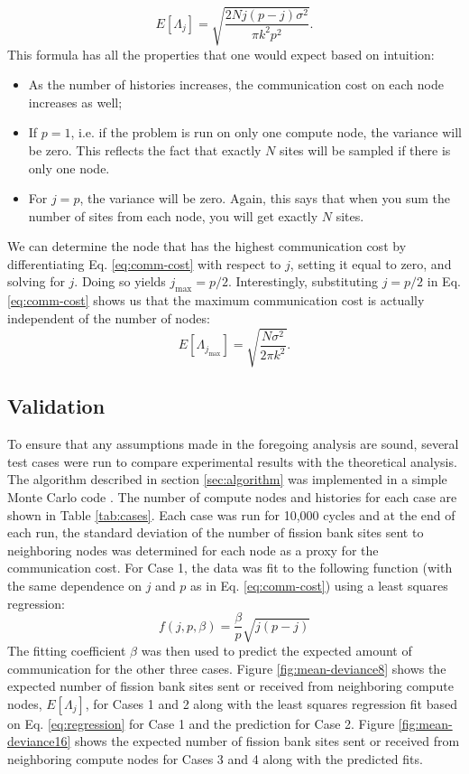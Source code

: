 \documentclass[11pt]{article}
\begin{document}
\begin{equation}\label{eq:comm-cost}
  E \left [ \Lambda_j \right ] = \sqrt{\frac{2Nj(p-j)\sigma^2}{\pi
      k^2p^2}}.
\end{equation}
This formula has all the properties that one would expect based on
intuition:
\begin{itemize}
\item As the number of histories increases, the communication cost on
  each node increases as well;
\item If $p=1$, i.e. if the problem is run on only one compute node,
  the variance will be zero. This reflects the fact that exactly $N$
  sites will be sampled if there is only one node.
\item For $j=p$, the variance will be zero. Again, this says that when
  you sum the number of sites from each node, you will get exactly $N$
  sites.
\end{itemize}
We can determine the node that has the highest communication cost by
differentiating Eq. \ref{eq:comm-cost} with respect to $j$, setting it
equal to zero, and solving for $j$. Doing so yields $j_{\text{max}} =
p/2$. Interestingly, substituting $j = p/2$ in Eq. \ref{eq:comm-cost}
shows us that the maximum communication cost is actually independent
of the number of nodes:
\begin{equation}
  E \left [ \Lambda_{j_{\text{max}}} \right ] = \sqrt{
    \frac{N\sigma^2}{2\pi k^2}}.
\end{equation}

\subsection{Validation}

To ensure that any assumptions made in the foregoing analysis are
sound, several test cases were run to compare experimental results
with the theoretical analysis. The algorithm described in section
\ref{sec:algorithm} was implemented in a simple Monte Carlo code
\cite{romano-LANL}. The number of compute nodes and histories for each
case are shown in Table \ref{tab:cases}.  Each case was run for 10,000
cycles and at the end of each run, the standard deviation of the
number of fission bank sites sent to neighboring nodes was determined
for each node as a proxy for the communication cost. For Case 1, the
data was fit to the following function (with the same dependence on
$j$ and $p$ as in Eq. \ref{eq:comm-cost}) using a least squares
regression:
\begin{equation}\label{eq:regression}
  f(j,p,\beta) = \frac{\beta}{p} \sqrt{j(p-j)}
\end{equation}
The fitting coefficient $\beta$ was then used to predict the expected
amount of communication for the other three cases. Figure
\ref{fig:mean-deviance8} shows the expected number of fission bank
sites sent or received from neighboring compute nodes, $E \left [
  \Lambda_j \right ]$, for Cases 1 and 2 along with the least squares
regression fit based on Eq. \ref{eq:regression} for Case 1 and the
prediction for Case 2. Figure \ref{fig:mean-deviance16} shows the
expected number of fission bank sites sent or received from
neighboring compute nodes for Cases 3 and 4 along with the predicted
fits.
\end{document}
